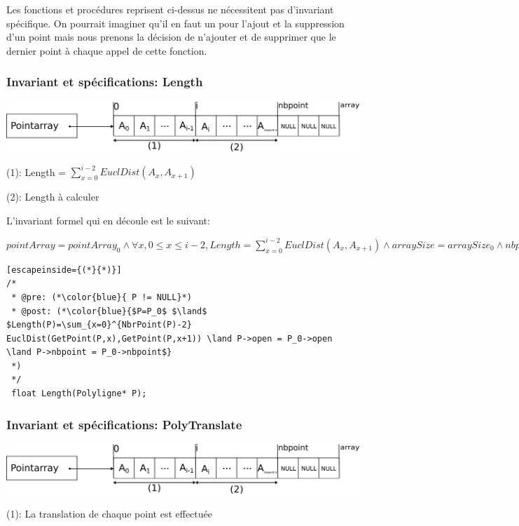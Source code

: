 \documentclass[a4paper, 11pt, oneside]{article}
\begin{document}
Les fonctions et procédures reprisent ci-dessus ne nécessitent pas d'invariant spécifique. On pourrait imaginer qu'il en faut un pour l'ajout et la suppression d'un point mais nous prenons la décision de n'ajouter et de supprimer que le dernier point à chaque appel de cette fonction. 

\subsubsection{Invariant et spécifications: Length}

\includegraphics[scale=0.8]{inv1.png}

(1): Length = $\sum_{x=0}^{i-2} EuclDist(A_x,A_{x+1})$

(2): Length à calculer

\bigskip

\noindent L'invariant formel qui en découle est le suivant:

\noindent$ pointArray = pointArray_0 \land \forall x, 0\leq x \leq i-2, Length =\sum_{x=0}^{i-2} EuclDist(A_x,A_{x+1}) \land arraySize = arraySize_0 \land nbpoint = nbpoint_0 $

\smallskip



\begin{lstlisting}[escapeinside={(*}{*)}]
/*
 * @pre: (*\color{blue}{ P != NULL}*)
 * @post: (*\color{blue}{$P=P_0$ $\land$ $Length(P)=\sum_{x=0}^{NbrPoint(P)-2} EuclDist(GetPoint(P,x),GetPoint(P,x+1)) \land P->open = P_0->open \land P->nbpoint = P_0->nbpoint$}
 *)
 */
 float Length(Polyligne* P);
\end{lstlisting}

\subsubsection{Invariant et spécifications: PolyTranslate}

\includegraphics[scale=0.8]{inv1.png}

(1): La translation de chaque point est effectuée
\end{document}
